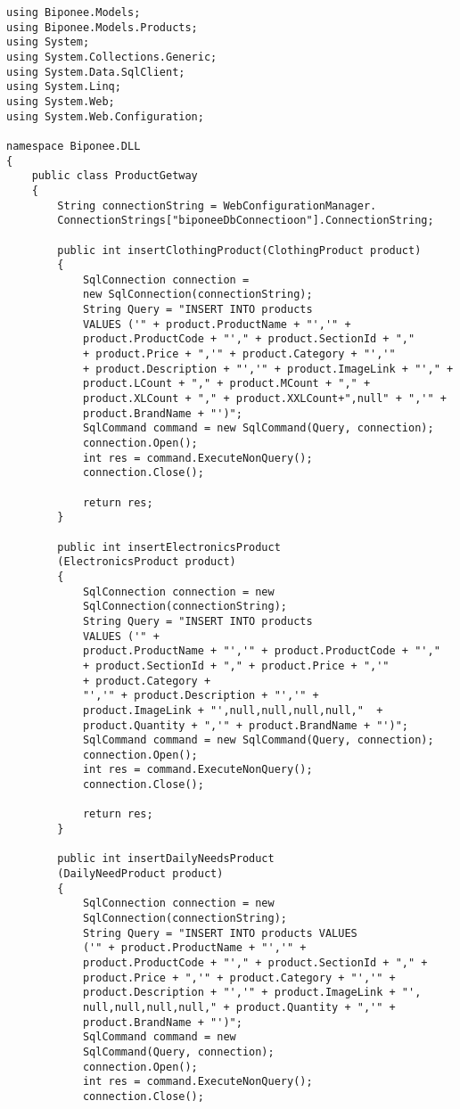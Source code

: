 \begin{lstlisting}
using Biponee.Models;
using Biponee.Models.Products;
using System;
using System.Collections.Generic;
using System.Data.SqlClient;
using System.Linq;
using System.Web;
using System.Web.Configuration;

namespace Biponee.DLL
{
    public class ProductGetway
    {
        String connectionString = WebConfigurationManager.
        ConnectionStrings["biponeeDbConnectioon"].ConnectionString;

        public int insertClothingProduct(ClothingProduct product)
        {
            SqlConnection connection = 
            new SqlConnection(connectionString);
            String Query = "INSERT INTO products 
            VALUES ('" + product.ProductName + "','" + 
            product.ProductCode + "'," + product.SectionId + "," 
            + product.Price + ",'" + product.Category + "','" 
            + product.Description + "','" + product.ImageLink + "'," + 
            product.LCount + "," + product.MCount + "," + 
            product.XLCount + "," + product.XXLCount+",null" + ",'" + 
            product.BrandName + "')";
            SqlCommand command = new SqlCommand(Query, connection);
            connection.Open();
            int res = command.ExecuteNonQuery();
            connection.Close();

            return res;
        }

        public int insertElectronicsProduct
        (ElectronicsProduct product)
        {
            SqlConnection connection = new 
            SqlConnection(connectionString);
            String Query = "INSERT INTO products 
            VALUES ('" + 
            product.ProductName + "','" + product.ProductCode + "'," 
            + product.SectionId + "," + product.Price + ",'" 
            + product.Category + 
            "','" + product.Description + "','" + 
            product.ImageLink + "',null,null,null,null,"  + 
            product.Quantity + ",'" + product.BrandName + "')";
            SqlCommand command = new SqlCommand(Query, connection);
            connection.Open();
            int res = command.ExecuteNonQuery();
            connection.Close();

            return res;
        }

        public int insertDailyNeedsProduct
        (DailyNeedProduct product)
        {
            SqlConnection connection = new 
            SqlConnection(connectionString);
            String Query = "INSERT INTO products VALUES 
            ('" + product.ProductName + "','" + 
            product.ProductCode + "'," + product.SectionId + "," + 
            product.Price + ",'" + product.Category + "','" + 
            product.Description + "','" + product.ImageLink + "',
            null,null,null,null," + product.Quantity + ",'" +
            product.BrandName + "')";
            SqlCommand command = new 
            SqlCommand(Query, connection);
            connection.Open();
            int res = command.ExecuteNonQuery();
            connection.Close();


\end{lstlisting}
